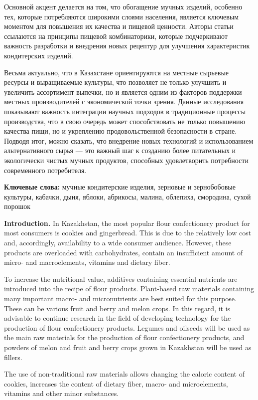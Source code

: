 Основной акцент делается на том, что обогащение мучных изделий, особенно
тех, которые потребляются широкими слоями населения, является ключевым
моментом для повышения их качества и пищевой ценности. Авторы статьи
ссылаются на принципы пищевой комбинаторики, которые подчеркивают
важность разработки и внедрения новых рецептур для улучшения
характеристик кондитерских изделий.

Весьма актуально, что в Казахстане ориентируются на местные сырьевые
ресурсы и выращиваемые культуры, что позволяет не только улучшить и
увеличить ассортимент выпечки, но и является одним из факторов поддержки
местных производителей с экономической точки зрения. Данные исследования
показывают важность интеграции научных подходов в традиционные процессы
производства, что в свою очередь может способствовать не только
повышению качества пищи, но и укреплению продовольственной безопасности
в стране. Подводя итог, можно сказать, что внедрение новых технологий и
использованием альтернативного сырья --- это важный шаг к созданию более
питательных и экологически чистых мучных продуктов, способных
удовлетворить потребности современного потребителя.

{\bfseries Ключевые слова:} мучные кондитерские изделия, зерновые и
зернобобовые культуры, кабачки, дыня, яблоки, абрикосы, малина,
облепиха, смородина, сухой порошок

{\bfseries Introduction.} In Kazakhstan, the most popular flour
confectionery product for most consumers is cookies and gingerbread.
This is due to the relatively low cost and, accordingly, availability to
a wide consumer audience. However, these products are overloaded with
carbohydrates, contain an insufficient amount of micro- and
macroelements, vitamins and dietary fiber.

To increase the nutritional value, additives containing essential
nutrients are introduced into the recipe of flour products. Plant-based
raw materials containing many important macro- and micronutrients are
best suited for this purpose. These can be various fruit and berry and
melon crops. In this regard, it is advisable to continue research in the
field of developing technology for the production of flour confectionery
products. Legumes and oilseeds will be used as the main raw materials
for the production of flour confectionery products, and powders of melon
and fruit and berry crops grown in Kazakhstan will be used as fillers.

The use of non-traditional raw materials allows changing the caloric
content of cookies, increases the content of dietary fiber, macro- and
microelements, vitamins and other minor substances.

